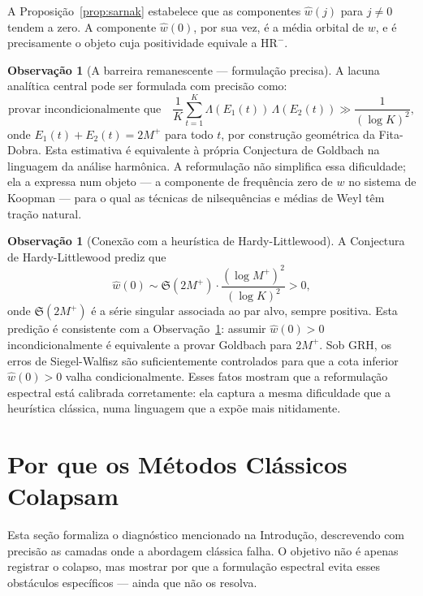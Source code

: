 \documentclass[12pt,a4paper]{article}
\theoremstyle{definition}
\newtheorem{remark}[theorem]{Observação}
\newcommand{\HRm}{\mathrm{HR}^{-}}
\begin{document}
	A Proposição~\ref{prop:sarnak} estabelece que as componentes
	$\widehat{w}(j)$ para $j \neq 0$ tendem a zero. A componente
	$\widehat{w}(0)$, por sua vez, é a média orbital de $w$, e é
	precisamente o objeto cuja positividade equivale a $\HRm$.
	
	\begin{remark}[A barreira remanescente — formulação precisa]
		\label{rem:barreira}
		A lacuna analítica central pode ser formulada com precisão como:
		\[
		\text{provar incondicionalmente que}\quad
		\frac{1}{K}\sum_{t=1}^K \Lambda(E_1(t))\,\Lambda(E_2(t)) \gg
		\frac{1}{(\log K)^2},
		\]
		onde $E_1(t)+E_2(t) = 2M^+$ para todo $t$, por construção
		geométrica da Fita-Dobra. Esta estimativa é equivalente à
		própria Conjectura de Goldbach na linguagem da análise harmônica.
		A reformulação não simplifica essa dificuldade; ela a expressa
		num objeto — a componente de frequência zero de $w$ no sistema
		de Koopman — para o qual as técnicas de nilsequências e médias
		de Weyl têm tração natural.
	\end{remark}
	
	\begin{remark}[Conexão com a heurística de Hardy-Littlewood]
		\label{rem:HL}
		A Conjectura de Hardy-Littlewood \cite{hardy-littlewood} prediz
		que
		\[
		\widehat{w}(0) \sim \mathfrak{S}(2M^+)\cdot
		\frac{(\log M^+)^2}{(\log K)^2} > 0,
		\]
		onde $\mathfrak{S}(2M^+)$ é a série singular associada ao par
		alvo, sempre positiva.
		Esta predição é consistente com a Observação~\ref{rem:barreira}:
		assumir $\widehat{w}(0) > 0$ incondicionalmente é equivalente a
		provar Goldbach para $2M^+$. Sob GRH, os erros de Siegel-Walfisz são
		suficientemente controlados para que a cota inferior
		$\widehat{w}(0) > 0$ valha condicionalmente. Esses fatos
		mostram que a reformulação espectral está calibrada corretamente:
		ela captura a mesma dificuldade que a heurística clássica, numa
		linguagem que a expõe mais nitidamente.
	\end{remark}
	
	\section{Por que os Métodos Clássicos Colapsam}
	\label{sec:crivo}
	
	Esta seção formaliza o diagnóstico mencionado na Introdução,
	descrevendo com precisão as camadas onde a abordagem clássica
	falha. O objetivo não é apenas registrar o colapso, mas mostrar
	por que a formulação espectral evita esses obstáculos específicos
	— ainda que não os resolva.
	
\end{document}
